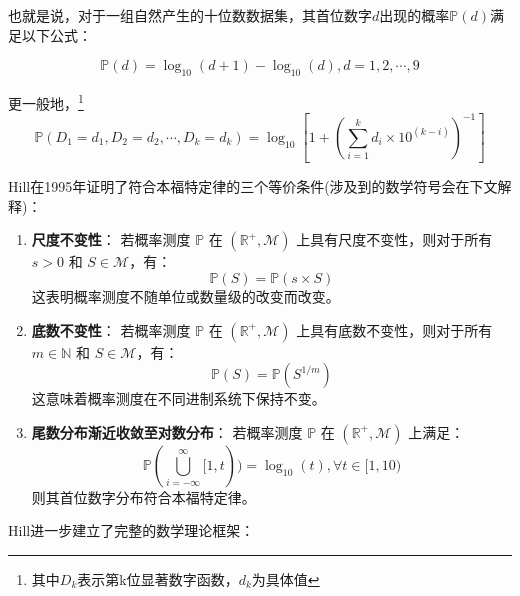 \documentclass{ctexart} %
\begin{document}
\vspace{0.5cm}

也就是说，对于一组自然产生的十位数数据集，其首位数字$d$出现的概率$\mathbb{P}(d)$满足以下公式：

\begin{equation}
    \mathbb{P} (d) = \log_{10}(d+1) - \log_{10}(d) , d = 1, 2, \cdots, 9
\end{equation}

更一般地，\footnote{其中$D_k$表示第k位显著数字函数，$d_k$为具体值}
\begin{equation}
    \mathbb{P} (D_1=d_1, D_2=d_2, \cdots, D_k=d_k)=\log_{10}[1+(\sum_{i=1}^{k}d_i\times10^{(k-i)})^{-1}]
\end{equation}

Hill在1995年证明了符合本福特定律的三个等价条件(涉及到的数学符号会在下文解释)：\cite{Hilla, Hillb}

\begin{enumerate}
    \item \textbf{尺度不变性}：
    若概率测度 $\mathbb{P} $ 在 $(\mathbb{R}^+,\mathscr{M})$ 上具有尺度不变性，则对于所有 $s>0$ 和 $S\in\mathscr{M}$，有：
    \begin{equation}
        \mathbb{P} (S) = \mathbb{P} (s\times S)
    \end{equation}
    这表明概率测度不随单位或数量级的改变而改变。

    \item \textbf{底数不变性}：
    若概率测度 $\mathbb{P} $ 在 $(\mathbb{R}^+,\mathscr{M})$ 上具有底数不变性，则对于所有 $m\in\mathbb{N}$ 和 $S\in\mathscr{M}$，有：
    \begin{equation}
        \mathbb{P} (S) = \mathbb{P} (S^{1/m})
    \end{equation}
    这意味着概率测度在不同进制系统下保持不变。

    \item \textbf{尾数分布渐近收敛至对数分布}：
    若概率测度 $\mathbb{P} $ 在 $(\mathbb{R}^+,\mathscr{M})$ 上满足：
    \begin{equation}
        \mathbb{P} (\bigcup_{i=-\infty}^{\infty}[1,t)) = \log_{10}(t), \forall t\in[1,10)
    \end{equation}
    则其首位数字分布符合本福特定律。
\end{enumerate}

Hill进一步建立了完整的数学理论框架：\cite{Hilla}
\end{document}
